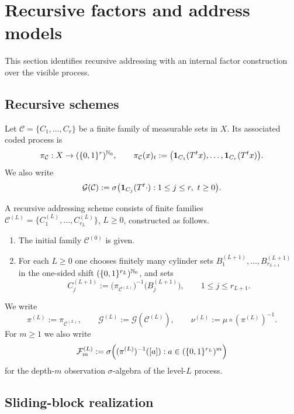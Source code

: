 \section{Recursive factors and address models}
\label{sec:recursive-addressing}

This section identifies recursive addressing with an internal factor
construction over the visible process.

\subsection{Recursive schemes}

Let \(\mathcal{C}=\{C_1,\ldots,C_r\}\) be a finite family of measurable
sets in \(X\).  Its associated coded process is
\[
  \pi_{\mathcal{C}}:X\to (\{0,1\}^r)^{\mathbb{N}_0},
  \qquad
  \pi_{\mathcal{C}}(x)_t
  := \bigl(\mathbf{1}_{C_1}(T^t x),\ldots,\mathbf{1}_{C_r}(T^t x)\bigr).
\]
We also write
\[
  \mathcal{G}(\mathcal{C})
  := \sigma\bigl(\mathbf{1}_{C_j}(T^t\cdot):
      1\leq j\leq r,\ t\geq 0\bigr).
\]

\begin{definition}
\label{def:recursive-scheme}
A recursive addressing scheme consists of finite families
\(\mathcal{C}^{(L)}=\{C^{(L)}_1,\ldots,C^{(L)}_{r_L}\}\), \(L\geq 0\),
constructed as follows.
\begin{enumerate}
  \item The initial family \(\mathcal{C}^{(0)}\) is given.
  \item For each \(L\geq 0\) one chooses finitely many cylinder sets
    \(B^{(L+1)}_1,\ldots,B^{(L+1)}_{r_{L+1}}\) in the one-sided shift
    \((\{0,1\}^{r_L})^{\mathbb{N}_0}\), and sets
    \[
      C^{(L+1)}_j
      := \bigl(\pi_{\mathcal{C}^{(L)}}\bigr)^{-1}
          \bigl(B^{(L+1)}_j\bigr),
      \qquad 1\leq j\leq r_{L+1}.
    \]
\end{enumerate}
We write
\[
  \pi^{(L)}:=\pi_{\mathcal{C}^{(L)}},
  \qquad
  \mathcal{G}^{(L)}:=\mathcal{G}(\mathcal{C}^{(L)}),
  \qquad
  \nu^{(L)} := \mu\circ(\pi^{(L)})^{-1}.
\]
For \(m\geq 1\) we also write
\[
  \mathcal{F}_m^{(L)}
  := \sigma\Bigl(
      (\pi^{(L)})^{-1}([a]):
      a\in(\{0,1\}^{r_L})^m
     \Bigr)
\]
for the depth-\(m\) observation \(\sigma\)-algebra of the level-\(L\)
process.
\end{definition}

\subsection{Sliding-block realization}

